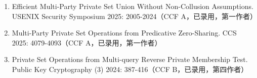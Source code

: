 
\publications

\begin{enumerate}
      \item Efficient Multi-Party Private Set Union Without Non-Collusion Assumptions. USENIX Security Symposium 2025: 2005-2024（CCF A，已录用，第一作者）  
      \item Multi-Party Private Set Operations from Predicative Zero-Sharing. CCS 2025: 4079-4093（CCF A，已录用，第一作者）  
      \item Private Set Operations from Multi-query Reverse Private Membership Test. Public Key Cryptography (3) 2024: 387-416（CCF B，已录用，第四作者）
\end{enumerate}